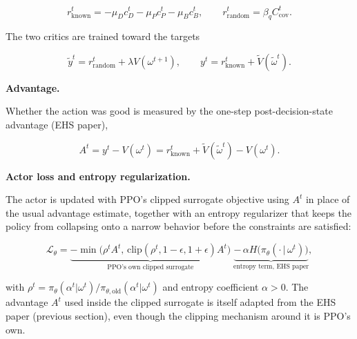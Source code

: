 \documentclass[10pt,conference,a4paper]{IEEEtran}
\newcommand{\head}[1]{%
    \vspace{2pt}
    \noindent
    \textbf{#1}
    \hspace{2pt}
}
\begin{document}
\begin{equation}
r_{\mathrm{known}}^t
=
-\mu_Dc_D^t-\mu_Pc_P^t-\mu_Bc_B^t,
\qquad
r_{\mathrm{random}}^t
=
\beta_qC_{\mathrm{cov}}^t.
\end{equation}

The two critics are trained toward the targets

\begin{equation}
\widetilde y^t
=
r_{\mathrm{random}}^t+\lambda V(\omega^{t+1}),
\qquad
y^t
=
r_{\mathrm{known}}^t+\widetilde V(\widetilde\omega^t).
\end{equation}


\head{Advantage.}
Whether the action was good is measured by the one-step
post-decision-state advantage (EHS paper),

\begin{equation}
A^t
=
y^t-V(\omega^t)
=
r_{\mathrm{known}}^t+\widetilde V(\widetilde\omega^t)-V(\omega^t).
\end{equation}


\head{Actor loss and entropy regularization.}
The actor is updated with PPO's clipped surrogate objective using
$A^t$ in place of the usual advantage estimate, together with an
entropy regularizer that keeps the policy from collapsing onto a
narrow behavior before the constraints are satisfied:

\begin{equation}
\mathcal L_\theta
=
\underbrace{
-\min\!\big(
\rho^tA^t,\,
\mathrm{clip}(\rho^t,1{-}\epsilon,1{+}\epsilon)A^t
\big)
}_{\text{PPO's own clipped surrogate}}
\;
\underbrace{
-\,\alpha H\big(\pi_\theta(\cdot\,|\,\omega^t)\big)
}_{\text{entropy term, EHS paper}},
\end{equation}

with $\rho^t=\pi_\theta(\alpha^t|\omega^t)/
\pi_{\theta,\mathrm{old}}(\alpha^t|\omega^t)$ and entropy
coefficient $\alpha>0$. The advantage $A^t$ used inside the
clipped surrogate is itself adapted from the EHS paper (previous
section), even though the clipping mechanism around it is PPO's
own.

\end{document}

